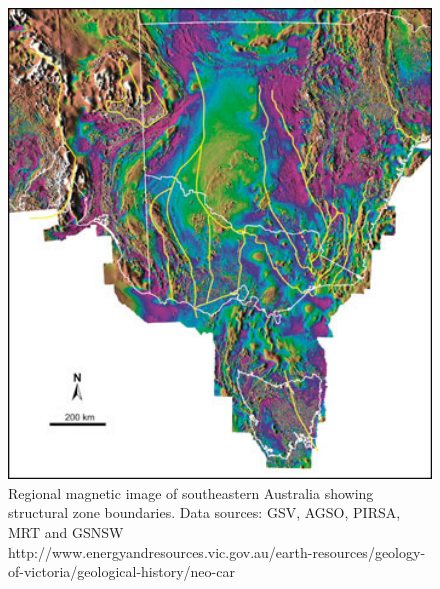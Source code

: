 \documentclass[a4paper]{article}
\begin{document}
\begin{figure}
\centering
\includegraphics[width=1\textwidth]{Geology_Neoproterozoic_Fig_1.jpg}
\caption{\label{fig:mangneticImage}Regional magnetic image of southeastern Australia showing structural zone boundaries. Data sources: GSV, AGSO, PIRSA, MRT and GSNSW http://www.energyandresources.vic.gov.au/earth-resources/geology-of-victoria/geological-history/neo-car}
\end{figure}
\end{document}
